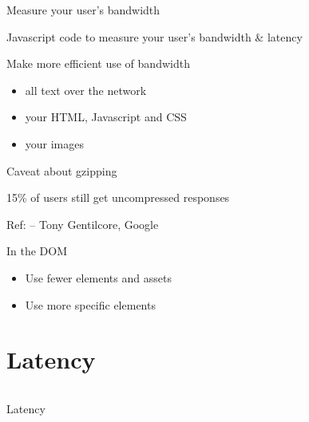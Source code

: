 \documentclass{beamer}
\begin{document}
\begin{frame}{Measure your user's bandwidth}
  \begin{center}
  Javascript code to measure your user's bandwidth \& latency \\
  \href{http://bluesmoon.info/perf-tests/bw/bw-test-1.3.zip}{}
  \end{center}
\end{frame}

\begin{frame}{Make more efficient use of bandwidth}
  \begin{itemize}
  \item \href{http://articles.sitepoint.com/article/web-output-mod_gzip-apache}{} all text over the network
  \item \href{http://developer.yahoo.com/yui/compressor/}{} your HTML, Javascript and CSS
  \item \href{http://www.smushit.com/}{} your images
  \end{itemize}
\end{frame}

\begin{frame}{Caveat about gzipping}
  \begin{center}
  15\% of users still get uncompressed responses
  \end{center}
  \vfill
  \tiny{Ref: \href{http://en.oreilly.com/velocity2009/public/schedule/detail/9072}{} -- Tony Gentilcore, Google}
\end{frame}

\begin{frame}{In the DOM}
  \begin{itemize}
  \item Use fewer elements and assets
  \item Use more specific elements
  \end{itemize}
\end{frame}


\section{Latency}

\begin{frame}{}
  \begin{columns}[t]
  \begin{block}{}
  \begin{center}
  Latency
  \end{center}
  \end{block}
  \end{columns}
\end{frame}
\end{document}
